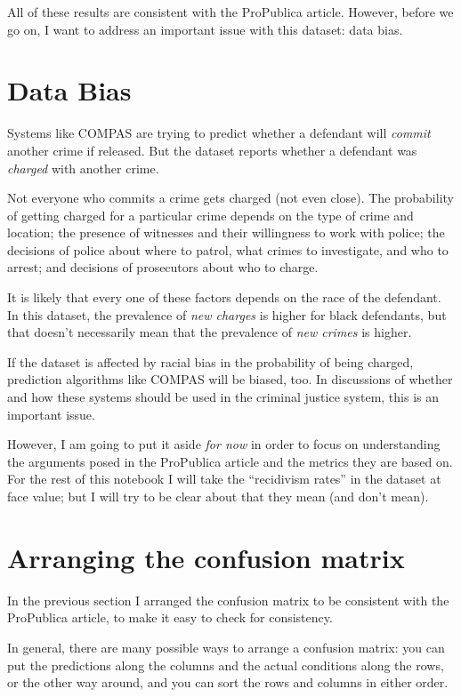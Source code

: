 All of these results are consistent with the ProPublica article.
However, before we go on, I want to address an important issue with this
dataset: data bias.

\hypertarget{data-bias}{%
\section{Data Bias}\label{data-bias}}

Systems like COMPAS are trying to predict whether a defendant will
\emph{commit} another crime if released. But the dataset reports whether
a defendant was \emph{charged} with another crime.

Not everyone who commits a crime gets charged (not even close). The
probability of getting charged for a particular crime depends on the
type of crime and location; the presence of witnesses and their
willingness to work with police; the decisions of police about where to
patrol, what crimes to investigate, and who to arrest; and decisions of
prosecutors about who to charge.

It is likely that every one of these factors depends on the race of the
defendant. In this dataset, the prevalence of \emph{new charges} is
higher for black defendants, but that doesn't necessarily mean that the
prevalence of \emph{new crimes} is higher.

If the dataset is affected by racial bias in the probability of being
charged, prediction algorithms like COMPAS will be biased, too. In
discussions of whether and how these systems should be used in the
criminal justice system, this is an important issue.

However, I am going to put it aside \emph{for now} in order to focus on
understanding the arguments posed in the ProPublica article and the
metrics they are based on. For the rest of this notebook I will take the
``recidivism rates'' in the dataset at face value; but I will try to be
clear about that they mean (and don't mean).

\hypertarget{arranging-the-confusion-matrix}{%
\section{Arranging the confusion
matrix}\label{arranging-the-confusion-matrix}}

In the previous section I arranged the confusion matrix to be consistent
with the ProPublica article, to make it easy to check for consistency.

In general, there are many possible ways to arrange a confusion matrix:
you can put the predictions along the columns and the actual conditions
along the rows, or the other way around, and you can sort the rows and
columns in either order.

